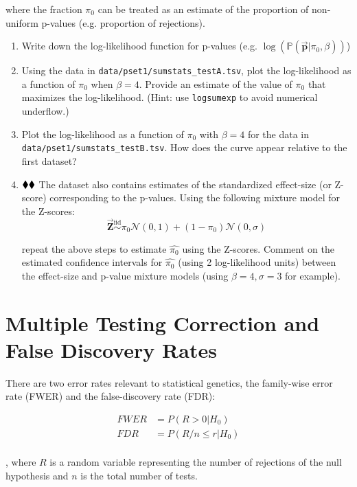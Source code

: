 \documentclass{pset}
\begin{document}
where the fraction $\pi_0$ can be treated as an estimate of the proportion of non-uniform p-values (e.g. proportion of rejections).

\begin{enumerate}
\item Write down the log-likelihood function for p-values (e.g. $\log (\mathbb{P}(\overrightarrow{\mathbf{p}} | \pi_0, \beta))$)
\item Using the data in \texttt{data/pset1/sumstats\_testA.tsv}, plot the log-likelihood as a function of $\pi_0$ when $\beta = 4$. Provide an estimate of the value of $\pi_0$ that maximizes the log-likelihood. (Hint: use \texttt{logsumexp} to avoid numerical underflow.)
\item Plot the log-likelihood as a function of $\pi_0$ with $\beta = 4$ for the data in \texttt{data/pset1/sumstats\_testB.tsv}. How does the curve appear relative to the first dataset?
\item $\mathbin{\blacklozenge}\mathbin{\blacklozenge}$ The dataset also contains estimates of the standardized effect-size (or Z-score) corresponding to the p-values. Using the following mixture model for the Z-scores: 
$$\overrightarrow{\mathbf{Z}} \overset{\text{iid}}{\sim} \pi_0 \mathcal{N}(0,1) + (1 - \pi_0)\mathcal{N}(0,\sigma)$$

repeat the above steps to estimate $\hat{\pi_0}$ using the Z-scores. Comment on the estimated confidence intervals for $\hat{\pi_0}$ (using 2 log-likelihood units) between the effect-size and p-value mixture models (using $\beta=4,\sigma=3$ for example).

\end{enumerate}

\section*{Multiple Testing Correction and False Discovery Rates}

There are two error rates relevant to statistical genetics, the family-wise error rate (FWER) and the false-discovery rate (FDR):

$$
\begin{aligned}
FWER &= P(R > 0 | H_0)\\
FDR &= P(R/n \leq r | H_0)\\
\end{aligned}
$$

, where $R$ is a random variable representing the number of rejections of the null hypothesis and $n$ is the total number of tests. 
\end{document}
